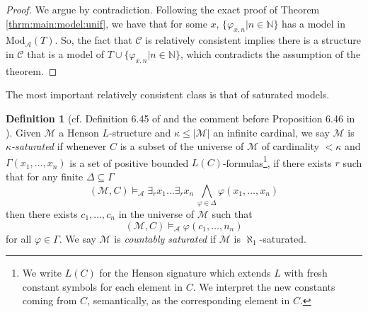 \documentclass[11pt]{amsart}
\theoremstyle{definition}
\newtheorem{definition}[theorem]{Definition}
\theoremstyle{remark}
\def\NN{\mathbb{N}}
\begin{document}
\begin{proof}
We argue by contradiction. Following the exact proof of Theorem \ref{thrm:main:model:unif}, we have that for some $x$, $\{\varphi_{x,n}| n \in \NN\}$ has a model in $\mathrm{Mod}_{\mathcal{A}}(T)$. So, the fact that $\mathscr{C}$ is relatively consistent implies there is a structure in $\mathscr{C}$ that is a model of $T\cup \{\varphi_{x,n}| n \in \NN\}$, which contradicts the assumption of the theorem.
\end{proof}
The most important relatively consistent class is that of saturated models.

\begin{definition}[cf. Definition 6.45 of \cite{DI2017} and the comment before Proposition 6.46 in \cite{DI2017}]
\label{def:sat}
Given $\mathcal{M}$ a Henson $L$-structure and $\kappa \le |\mathcal{M}|$ an infinite cardinal, we say $\mathcal{M}$ is \emph{$\kappa$-saturated} if whenever $C$ is a subset of the universe of $\mathcal{M}$ of cardinality $<\kappa$ and $\Gamma(x_1,\ldots,x_n)$ is a set of positive bounded $L(C)$-formulas\footnote{We write $L(C)$ for the Henson signature which extends $L$ with fresh constant symbols for each element in $C$. We interpret the new constants coming from $C$, semantically, as the corresponding element in $C$.}, if there exists $r$ such that for any finite $\Delta\subseteq \Gamma$ 
$$(\mathcal{M},C)\models_{\mathcal{A}}\exists_r x_1\ldots \exists_r x_n\, \bigwedge_{\varphi \in \Delta} \varphi(x_1,\ldots,x_n)$$
then there exists $c_1,\ldots,c_n$ in the universe of $\mathcal{M}$ such that 
$$(\mathcal{M},C)\models_{\mathcal{A}}\varphi(c_1,\ldots,n_n)$$
for all $\varphi \in \Gamma$. We say $\mathcal{M}$ is \emph{countably saturated} if $\mathcal{M}$ is $\aleph_1$-saturated.
\end{definition}
\end{document}
